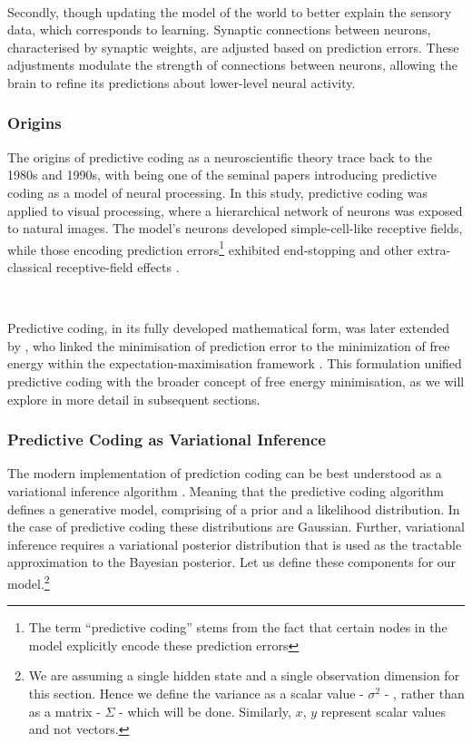 \documentclass{article}
\begin{document}
\

Secondly, though updating the model of the world to better explain the sensory data, which corresponds to learning. Synaptic connections between neurons, characterised by synaptic weights, are adjusted based on prediction errors. These adjustments modulate the strength of connections between neurons, allowing the brain to refine its predictions about lower-level neural activity.

\subsubsection{Origins}

The origins of predictive coding as a neuroscientific theory trace back to the 1980s and 1990s, with \citet{rao1999predictive} being one of the seminal papers introducing predictive coding as a model of neural processing. In this study, predictive coding was applied to visual processing, where a hierarchical network of neurons was exposed to natural images. The model's neurons developed simple-cell-like receptive fields, while those encoding prediction errors\footnote{The term ``predictive coding'' stems from the fact that certain nodes in the model explicitly encode these prediction errors} exhibited end-stopping and other extra-classical receptive-field effects \citep{rao1999predictive}.

\

Predictive coding, in its fully developed mathematical form, was later extended by \citet{friston2003learning, friston2005theory}, who linked the minimisation of prediction error to the minimization of free energy within the expectation-maximisation framework \citep{dempster1977maximum}. This formulation unified predictive coding with the broader concept of free energy minimisation, as we will explore in more detail in subsequent sections.

\subsubsection{Predictive Coding as Variational Inference}

The modern implementation of prediction coding can be best understood as a variational inference algorithm \citep{millidge2021applications}. Meaning that the predictive coding algorithm defines a generative model, comprising of a prior and a likelihood distribution. In the case of predictive coding these distributions are Gaussian. Further, variational inference requires a variational posterior distribution that is used as the tractable approximation to the Bayesian posterior. Let us define these components for our model.\footnote{We are assuming a single hidden state and a single observation dimension for this section. Hence we define the variance as a scalar value - $\sigma^2$ - , rather than as a matrix - $\Sigma$ - which will be done. Similarly, $x$, $y$ represent scalar values and not vectors. }
\end{document}
